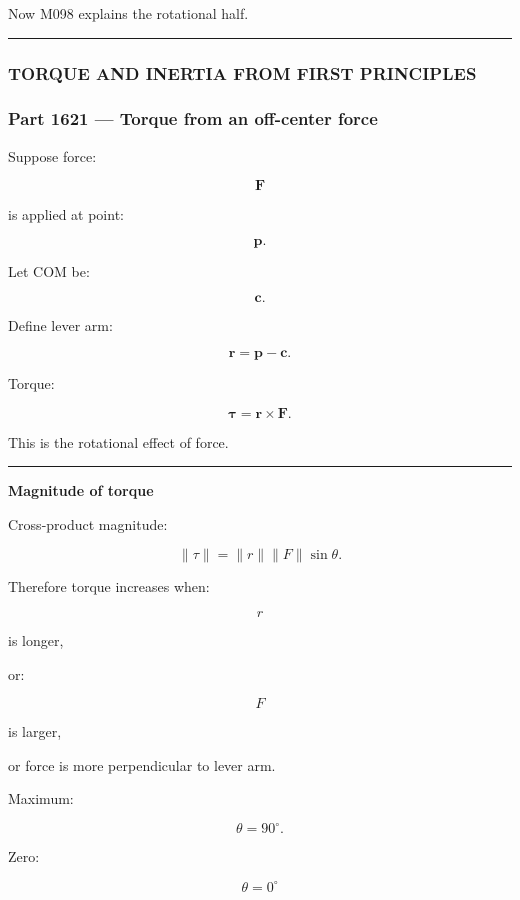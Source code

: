 Now M098 explains the rotational half.

\begin{center}\rule{0.5\linewidth}{0.5pt}\end{center}

\subsubsection{TORQUE AND INERTIA FROM FIRST PRINCIPLES}\label{torque-and-inertia-from-first-principles}

\subsubsection{Part 1621 --- Torque from an off-center force}\label{part-1621-torque-from-an-off-center-force}

Suppose force:

\[
\mathbf{F}
\]

is applied at point:

\[
\mathbf{p}.
\]

Let COM be:

\[
\mathbf{c}.
\]

Define lever arm:

\[
\boxed{
\mathbf{r}
=
\mathbf{p}-\mathbf{c}.
}
\]

Torque:

\[
\boxed{
\boldsymbol{\tau}
=
\mathbf{r}\times\mathbf{F}.
}
\]

This is the rotational effect of force.

\begin{center}\rule{0.5\linewidth}{0.5pt}\end{center}

\textbf{Magnitude of torque}

Cross-product magnitude:

\[
\|\tau\|
=
\|r\|\|F\|\sin\theta.
\]

Therefore torque increases when:

\[
r
\]

is longer,

or:

\[
F
\]

is larger,

or force is more perpendicular to lever arm.

Maximum:

\[
\theta=90^\circ.
\]

Zero:

\[
\theta=0^\circ
\]

